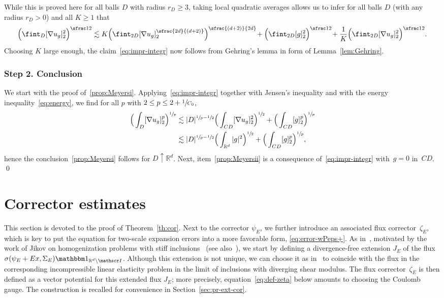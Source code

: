 \documentclass[JEP,XML,SOM,Unicode,published]{cedram}
\let\mathcal\mathscr
\newcommand{\psfrac}[2]{\sfrac{(#1)}{#2}}
\newcommand{\spfrac}[2]{\sfrac{#1}{(#2)}}
\let\mathds\mathbbm
\theoremstyle{plain}
\theoremstyle{definition}
\newcommand{\R}{\mathbb R}
\newcommand{\Ic}{\mathcal I}
\newcommand{\step}[1]{\subsubsection*{Step #1}}
\begin{document}
While this is proved here for all balls $D$ with radius $r_D\ge3$, taking local quadratic averages allows us to infer for all balls $D$ (with any radius $r_D>0$) and all $K\ge1$ that
\begin{equation*}
\Big(\fint_{D}[\nabla u_g]_2^2\Big)^{\sfrac12}
\lesssim K\Big(\fint_{2D}[\nabla u_g]_2^{\spfrac{2d}{d+2}}\Big)^{\psfrac{d+2}{2d}}\!+\Big(\fint_{2D}[g]_2^2\Big)^{\sfrac12}\!+\frac1K\Big(\fint_{2D}[\nabla u_g]_2^2\Big)^{\sfrac12}.
\end{equation*}
Choosing $K$ large enough, the claim~\eqref{eq:impr-integr} now follows from Gehring's lemma in form of Lemma~\ref{lem:Gehring}.

\step{2. Conclusion}
We start with the proof of~\eqref{prop:Meyersi}.
Applying~\eqref{eq:impr-integr} together with Jensen's inequality and with the energy inequality~\eqref{eq:energy}, we find for all $p$ with \hbox{$2\le p\le2+\sfrac1{C_0}$},
\begin{align*}
\Big(\int_{D}[\nabla u_g]_2^p\Big)^{\sfrac1p}
&\lesssim |D|^{\sfrac1p-\sfrac12}\Big(\int_{CD}[\nabla u_g]_2^2\Big)^{\sfrac12}+\Big(\int_{CD}[g]_2^p\Big)^{\sfrac1p}\\
&\lesssim |D|^{\sfrac1p-\sfrac12}\Big(\int_{\R^d}|g|^2\Big)^{\sfrac12}+\Big(\int_{CD}[g]_2^p\Big)^{\sfrac1p},
\end{align*}
hence the conclusion~\eqref{prop:Meyersi} follows for $D\uparrow\R^d$.
Next, item~\eqref{prop:Meyersii} is a consequence of~\eqref{eq:impr-integr} with~$g=0$ in~$CD$.
\qed

\section{Corrector estimates}
This section is devoted to the proof of Theorem~\ref{th:cor}.
Next to the corrector $\psi_E$, we further introduce an associated flux corrector~$\zeta_E$,
which is key to put the equation for two-scale expansion errors into a more favorable form, \cf \eqref{eq:error-wPeps+}.
As in~\cite[Th.\,4]{D-20}, moti\-vated by the work of Jikov on homogenization problems with stiff inclusions~\hbox{\cite{Jikov-87,Jikov-90}} (see also~\cite[\S 3.2]{JKO94}), we start by defining a divergence-free extension $J_E$ of the flux $\sigma(\psi_E+Ex,\Sigma_E)\mathds1_{\R^d\setminus\Ic}$.
Although this extension is not unique, we can choose it as in~\cite{D-20} to coincide with the flux in the corresponding incompressible linear elasticity problem in the limit of inclusions with diverging shear modulus.
The flux corrector~$\zeta_E$ is then defined as a vector potential for this extended flux $J_E$; more precisely, equation~\eqref{eq:def-zeta} below amounts to choosing the Coulomb gauge. The construction is recalled for convenience in Section~\ref{sec:pr-ext-cor}.
\end{document}
